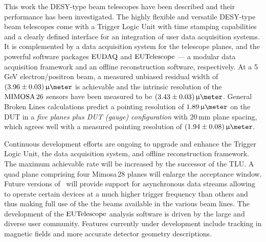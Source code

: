 

This work the DESY-type beam telescopes have been described and their performance has been investigated. 
The highly flexible and versatile DESY-type beam telescopes come with a Trigger Logic Unit with time stamping capabilities and a clearly defined interface for an integration of user data acquisition systems.
It is complemented by a data acquisition system for the telescope planes, and the powerful software packages $\textrm{EUDAQ}$ and $\textrm{EUTelescope}$
 ---  a modular data acquisition framework and an offline reconstruction software, respectively. 
At a 5\,GeV electron/positron beam, a measured unbiased residual width of $(3.96 \pm 0.03)\,\upmu\meter$ is achievable
 and the intrinsic resolution of the $\textrm{MIMOSA\,26}$ sensors have been measured to be $(3.43 \pm 0.03)\,\upmu\meter$.
General Broken Lines calculations predict a pointing resolution of $1.89\,\upmu\meter$ on the DUT in a \textit{five planes plus DUT (gauge) configuration} with 20\,mm plane spacing,
 which agrees well with a measured pointing resolution of $(1.94 \pm 0.08)\,\upmu\meter$.

Continuous development efforts are ongoing to upgrade and enhance the Trigger Logic Unit, the data acquisition system, and offline reconstruction framework.  
The maximum achievable rate will be increased by the successor of the TLU. 
A quad plane comprising four Mimosa\,28 planes will enlarge the acceptance window. 
Future versions of \eudaq\ will provide support for asynchronous data streams allowing to operate certain devices at a much higher trigger frequency than others
 and thus making full use of the the beams available in the various beam lines.
The development of the $\textrm{EUTelescope}$ analysis software is driven by the large and diverse user community. 
Features currently under development include tracking in magnetic fields and more accurate detector geometry descriptions. 
